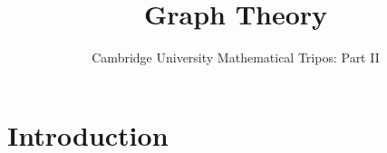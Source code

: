 \documentclass{article}
\title{Graph Theory}
\author{Cambridge University Mathematical Tripos: Part II}
\begin{document}
\maketitle

\tableofcontentsnewpage{}

\section{Introduction}

\end{document}
